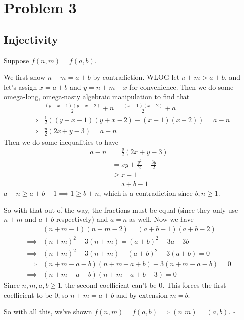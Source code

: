 \documentclass[12pt]{article}
\begin{document}
\section{Problem 3}

\subsection{Injectivity}

Suppose $f(n, m)=f(a, b)$.

We first show $n+m=a+b$ by contradiction.
WLOG let $n+m > a+b$, and let's assign $x=a+b$ and $y=n+m-x$ for convenience.
Then we do some omega-long, omega-nasty algebraic manipulation to find that
\begin{align*}
             & \frac{(y+x-1)(y+x-2)}{2}+n=\frac{(x-1)(x-2)}{2}+a \\
  \implies{} & \frac{1}{2}((y+x-1)(y+x-2)-(x-1)(x-2))=a-n        \\
  \implies{} & \frac{y}{2}(2x+y-3)=a-n
\end{align*}
Then we do some inequalities to have
\begin{align*}
  a-n
   & = \frac{y}{2}(2x+y-3)           \\
   & = xy+\frac{y^2}{2}-\frac{3y}{2} \\
   & \ge x-1                         \\
   & = a+b-1
\end{align*}
$a-n \ge a+b-1 \implies 1 \ge b+n$, which is a contradiction since $b, n \ge 1$.

So with that out of the way, the fractions must be equal
(since they only use $n+m$ and $a+b$ respectively) and $a=n$ as well.
Now we have
\begin{align*}
             & (n+m-1)(n+m-2)=(a+b-1)(a+b-2)   \\
  \implies{} & (n+m)^2-3(n+m)=(a+b)^2-3a-3b    \\
  \implies{} & (n+m)^2-3(n+m)-(a+b)^2+3(a+b)=0 \\
  \implies{} & (n+m-a-b)(n+m+a+b)-3(n+m-a-b)=0 \\
  \implies{} & (n+m-a-b)(n+m+a+b-3)=0
\end{align*}
Since $n, m, a, b \ge 1$, the second coefficient can't be $0$.
This forces the first coefficient to be $0$, so $n+m=a+b$ and by extension $m=b$.

So with all this, we've shown $f(n, m)=f(a, b) \implies (n, m)=(a, b)$. $\square$

\pagebreak
\end{document}
